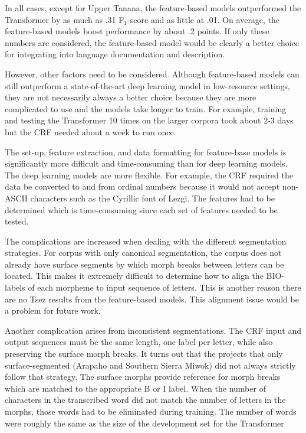 In all cases, except for Upper Tanana, the feature-based models outperformed the Transformer by as much as .31 F$_1$-score and as little at .01. On average, the feature-based models boost performance by about .2 points. If only these numbers are considered, the feature-based model would be clearly a better choice for integrating into language documentation and description. 

However, other factors need to be considered. Although feature-based models can still outperform a state-of-the-art deep learning model in low-resource settings, they are not necessarily always a better choice because they are more complicated to use and the models take longer to train. For example, training and testing the Transformer 10 times on the larger corpora took about 2-3 days but the CRF needed about a week to run once. 

The set-up, feature extraction, and data formatting for feature-base models is significantly more difficult and time-consuming than for deep learning models. The deep learning models are more flexible. For example, the CRF required the data be converted to and from ordinal numbers because it would not accept non-ASCII characters such as the Cyrillic font of Lezgi. The features had to be determined which is time-consuming since each set of features needed to be tested. 

The complications are increased when dealing with the different segmentation strategies. For corpus with only canonical segmentation, the corpus does not already have surface segments by which morph breaks between letters can be located. This makes it extremely difficult to determine how to align the BIO-labels of each morpheme to input sequence of letters. This is another reason there are no Tsez results from the feature-based models. This alignment issue would be a problem for future work. 

Another complication arises from inconsistent segmentations. The CRF input and output sequences must be the same length, one label per letter, while also preserving the surface morph breaks. It turns out that the projects that only surface-segmented (Arapaho and Southern Sierra Miwok) did not always strictly follow that strategy. The surface morphs provide reference for morph breaks which are matched to the appropriate B or I label. When the number of characters in the transcribed word did not match the number of letters in the morphs, those words had to be eliminated during training. The number of words were roughly the same as the size of the development set for the Transformer 


